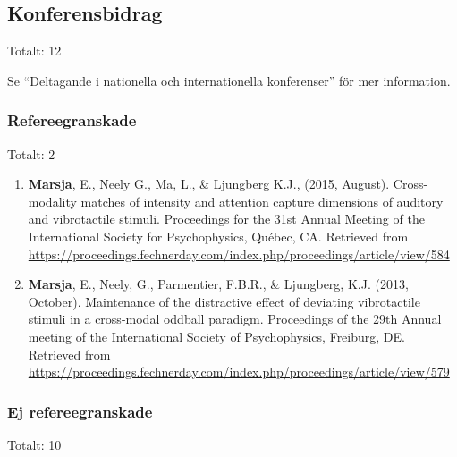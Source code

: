 \documentclass[]{article}
\begin{document}
\hypertarget{konferensbidrag}{%
\subsection{Konferensbidrag}\label{konferensbidrag}}

Totalt: 12

Se ``Deltagande i nationella och internationella konferenser'' för mer
information.

\hypertarget{refereegranskade}{%
\subsubsection{Refereegranskade}\label{refereegranskade}}

Totalt: 2

\begin{enumerate}
\def\labelenumi{\arabic{enumi}.}
\item
  \textbf{Marsja}, E., Neely G., Ma, L., \& Ljungberg K.J., (2015,
  August). Cross-modality matches of intensity and attention capture
  dimensions of auditory and vibrotactile stimuli. Proceedings for the
  31st Annual Meeting of the International Society for Psychophysics,
  Québec, CA. Retrieved from
  \url{https://proceedings.fechnerday.com/index.php/proceedings/article/view/584}
\item
  \textbf{Marsja}, E., Neely, G., Parmentier, F.B.R., \& Ljungberg, K.J.
  (2013, October). Maintenance of the distractive effect of deviating
  vibrotactile stimuli in a cross-modal oddball paradigm. Proceedings of
  the 29th Annual meeting of the International Society of Psychophysics,
  Freiburg, DE. Retrieved from
  \url{https://proceedings.fechnerday.com/index.php/proceedings/article/view/579}
\end{enumerate}

\hypertarget{ej-refereegranskade}{%
\subsubsection{Ej refereegranskade}\label{ej-refereegranskade}}

Totalt: 10
\end{document}
